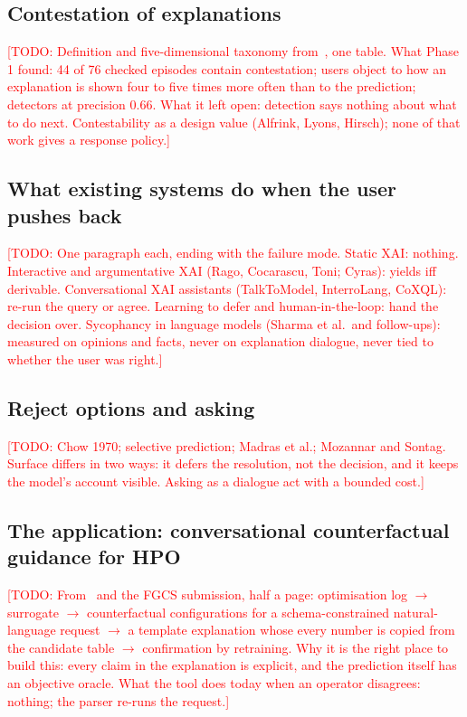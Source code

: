 \documentclass[preprint,12pt,3p,times]{elsarticle}
\newcommand{\todo}[1]{\textcolor{red}{[TODO: #1]}}
\begin{document}
\subsection{Contestation of explanations}
\todo{Definition and five-dimensional taxonomy from~\cite{phase1}, one table. What Phase 1 found: 44 of 76 checked episodes contain contestation; users object to how an explanation is shown four to five times more often than to the prediction; detectors at precision 0.66. What it left open: detection says nothing about what to do next. Contestability as a design value (Alfrink, Lyons, Hirsch); none of that work gives a response policy.}
\subsection{What existing systems do when the user pushes back}
\todo{One paragraph each, ending with the failure mode. Static XAI: nothing. Interactive and argumentative XAI (Rago, Cocarascu, Toni; Cyras): yields iff derivable. Conversational XAI assistants (TalkToModel, InterroLang, CoXQL): re-run the query or agree. Learning to defer and human-in-the-loop: hand the decision over. Sycophancy in language models (Sharma et al.\ and follow-ups): measured on opinions and facts, never on explanation dialogue, never tied to whether the user was right.}
\subsection{Reject options and asking}
\todo{Chow 1970; selective prediction; Madras et al.; Mozannar and Sontag. Surface differs in two ways: it defers the resolution, not the decision, and it keeps the model's account visible. Asking as a dialogue act with a bounded cost.}
\subsection{The application: conversational counterfactual guidance for HPO}
\todo{From~\cite{manai2026orders} and the FGCS submission, half a page: optimisation log $\to$ surrogate $\to$ counterfactual configurations for a schema-constrained natural-language request $\to$ a template explanation whose every number is copied from the candidate table $\to$ confirmation by retraining. Why it is the right place to build this: every claim in the explanation is explicit, and the prediction itself has an objective oracle. What the tool does today when an operator disagrees: nothing; the parser re-runs the request.}
\end{document}
